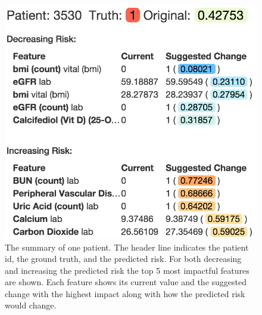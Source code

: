 \begin{figure}[t]
\centering
\includegraphics[width=0.5\linewidth]{prospector/patient_summary} %
\caption[The summary of one patient.]{
The summary of one patient. The header line indicates the patient id, the ground truth, and the predicted
risk.
For both decreasing and increasing the predicted risk the top 5 most impactful features are shown.
Each feature shows its current value and the suggested change with the highest impact along with how the predicted risk would change.
}
\label{figs:summary}
\end{figure}